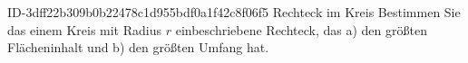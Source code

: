 \begin{exercise}
      {ID-3dff22b309b0b22478c1d955bdf0a1f42c8f06f5}
      {Rechteck im Kreis}
  \ifproblem\problem
    Bestimmen Sie das einem Kreis mit Radius $r$ einbeschriebene Rechteck,
    das \quad a) den größten Flächeninhalt und \quad b) den größten Umfang hat.
  \fi
\end{exercise}

